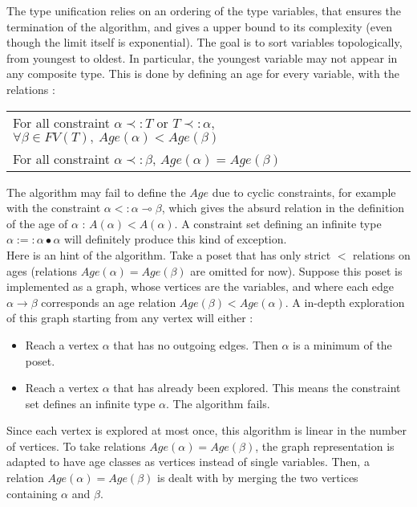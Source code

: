 \begin{defn}
	The type unification relies on an ordering of the type variables, that ensures the termination of the algorithm, and gives a upper
	bound to its complexity (even though the limit itself is exponential).
	The goal is to sort variables topologically, from youngest to oldest. In particular,
  the youngest variable may not appear in any composite type. This is done by defining an age for every variable, with the
  relations :
  	\begin{center}
  	\begin{tabular}{l}
  	  For all constraint $\alpha \prec: T$ or $T \prec: \alpha$, $\forall \beta \in FV(T), ~ Age (\alpha) < Age (\beta)$ \\
  	  For all constraint $\alpha \prec: \beta$, $Age (\alpha) = Age (\beta)$
  	\end{tabular}
  	\end{center}
  The algorithm may fail to define the $Age$ due to cyclic constraints, for example with the constraint $\alpha <: \alpha \multimap \beta$,
  which gives the absurd relation in the definition of the age of $\alpha$ : $A(\alpha) < A(\alpha)$. A constraint set defining an
  infinite type $\alpha :=: \alpha \bullet \alpha$ will definitely produce this kind of exception. \\
  
  Here is an hint of the algorithm. Take a poset that has only strict $<$ relations on ages (relations $Age (\alpha) = Age(\beta)$ are omitted for now).
  Suppose this poset is implemented as a graph, whose vertices are the variables, and where each edge $\alpha \rightarrow \beta$ corresponds an
  age relation $Age(\beta) < Age(\alpha)$. A in-depth exploration of this graph starting from any vertex will either :
  	\begin{itemize}
  		\item Reach a vertex $\alpha$ that has no outgoing edges. Then $\alpha$ is a minimum of the poset.
  		\item Reach a vertex $\alpha$ that has already been explored. This means the constraint set defines an infinite type $\alpha$.
  			The algorithm fails.
  	\end{itemize}
  Since each vertex is explored at most once, this algorithm is linear in the number of vertices. To take relations $Age(\alpha) = Age(\beta)$,
  the graph representation is adapted to have age classes as vertices instead of single variables. Then, a relation $Age(\alpha) = Age(\beta)$
  is dealt with by merging the two vertices containing $\alpha$ and $\beta$.
\end{defn}

